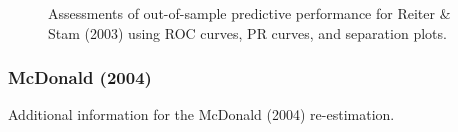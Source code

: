 \begin{figure}
	\centering   
	\caption{Assessments of out-of-sample predictive performance for Reiter \& Stam (2003) using ROC curves, PR curves, and separation plots.}
\end{figure}
\FloatBarrier
\clearpage

\subsubsection*{McDonald (2004)}

Additional information for the McDonald (2004) re-estimation.


\FloatBarrier

